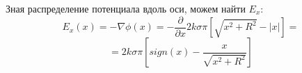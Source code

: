 \documentclass[a5paper,10pt]{article}\usepackage[usenames,dvipsnames]{color}\usepackage{extsizes,cmap,graphicx,misccorr,indentfirst,makecell,multirow,ulem,geometry,amssymb,amsfonts,amsmath,amsthm,titlesec,float,fancyhdr,wrapfig,tikz,pgfplots}\usepackage[T2A]{fontenc}\usepackage[utf8x]{inputenc}\usepackage[english, russian]{babel}\usetikzlibrary{decorations.pathreplacing,decorations.pathmorphing,patterns,calc,scopes,arrows,through,positioning,shapes.misc}\graphicspath{{img/}}\linespread{1.3}\frenchspacing\geometry{left=1cm, right=1cm, top=2cm, bottom=1cm, bindingoffset=0cm}\pagestyle{fancy}\fancyhead{}\fancyhead[R]{Сарафанов Ф.Г.}
\begin{document}
Зная распределение потенциала вдоль оси, можем найти $E_x$:
\begin{equation}
    E_x(x)=-\nabla \phi(x)=-\frac{\partial}{\partial x}2k\sigma\pi\left[\sqrt{x^2+R^2}-|{x}|\right]=
    \end{equation}
\begin{equation}
    =2k\sigma\pi\left[sign(x)-\frac{x}{\sqrt{x^2+R^2}}\right]
\end{equation}

\end{document}
